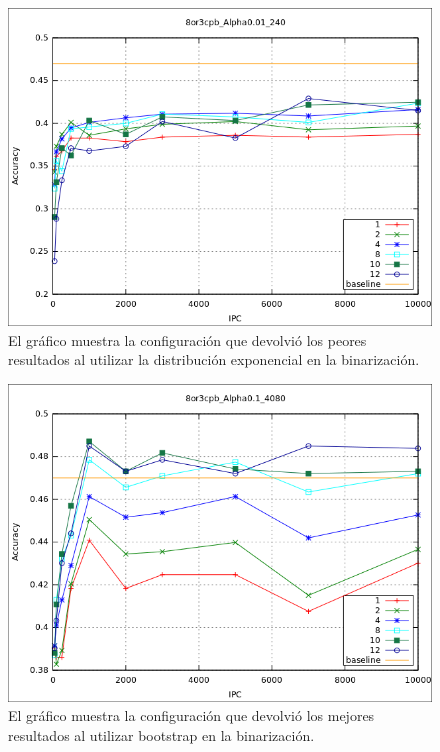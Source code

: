 			\begin{figure}[htbp]
				\centering
				\includegraphics[scale=0.6]{img/resultados/sinteticas/worst_expon_8or3cpb_Alpha0,01_240.png}
				\caption[Sintéticas exponencial peor resultado]{El gráfico muestra la configuración que devolvió los peores resultados al utilizar la distribución exponencial en la binarización.}
				\label{fig: Sinteticas-expon-bajo}
			\end{figure}
			
			\begin{figure}[htbp]
				\centering
				\includegraphics[scale=0.6]{img/resultados/sinteticas/best_bootstrap_8or3cpb_Alpha0,1_4080.png}
				\caption[Sintéticas bootstrap mejor resultado]{El gráfico muestra la configuración que devolvió los mejores resultados al utilizar bootstrap en la binarización.}
				\label{fig: Sinteticas-bootstrap-mejor}
			\end{figure}
	
